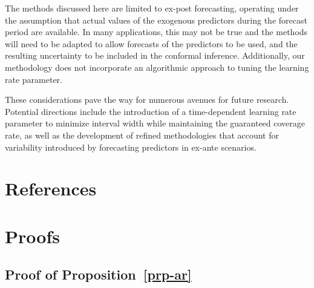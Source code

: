 \documentclass[
  11pt,
  a4paper,
]{article}
\theoremstyle{plain}
\theoremstyle{remark}
\begin{document}
The methods discussed here are limited to ex-post forecasting, operating
under the assumption that actual values of the exogenous predictors
during the forecast period are available. In many applications, this may
not be true and the methods will need to be adapted to allow forecasts
of the predictors to be used, and the resulting uncertainty to be
included in the conformal inference. Additionally, our methodology does
not incorporate an algorithmic approach to tuning the learning rate
parameter.

These considerations pave the way for numerous avenues for future
research. Potential directions include the introduction of a
time-dependent learning rate parameter to minimize interval width while
maintaining the guaranteed coverage rate, as well as the development of
refined methodologies that account for variability introduced by
forecasting predictors in ex-ante scenarios.

\section*{References}\label{references}

\printbibliography[heading=none]

\newpage
\appendix
\setcounter{section}{0}
\renewcommand{\thesection}{Appendix \Alph{section}}
\renewcommand{\thesubsection}{\Alph{section}.\arabic{subsection}}
\renewcommand{\thefigure}{A\arabic{figure}}
\renewcommand{\thetable}{A\arabic{table}}
\setcounter{figure}{0}
\setcounter{table}{0}

\section{Proofs}\label{sec-proof}

\subsection{\texorpdfstring{Proof of
Proposition~\ref{prp-ar}}{Proof of Proposition~}}\label{sec-proof_ar}
\end{document}

